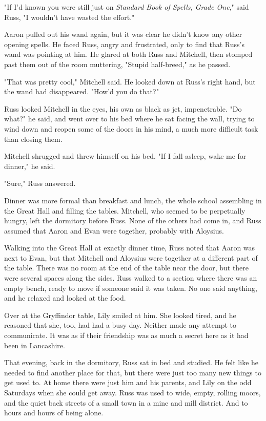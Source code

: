 \documentclass[a4paper,11pt]{article}
\begin{document}
"If I'd known you were still just on \emph{Standard Book of Spells, Grade One}," said Russ, "I wouldn't have wasted the effort."

Aaron pulled out his wand again, but it was clear he didn't know any other opening spells. He faced Russ, angry and frustrated, only to find that Russ's wand was pointing at him. He glared at both Russ and Mitchell, then stomped past them out of the room muttering, "Stupid half-breed," as he passed.

"That was pretty cool," Mitchell said. He looked down at Russ's right hand, but the wand had disappeared. "How'd you do that?"

Russ looked Mitchell in the eyes, his own as black as jet, impenetrable. "Do what?" he said, and went over to his bed where he sat facing the wall, trying to wind down and reopen some of the doors in his mind, a much more difficult task than closing them.

Mitchell shrugged and threw himself on his bed. "If I fall asleep, wake me for dinner," he said.

"Sure," Russ answered.

Dinner was more formal than breakfast and lunch, the whole school assembling in the Great Hall and filling the tables. Mitchell, who seemed to be perpetually hungry, left the dormitory before Russ. None of the others had come in, and Russ assumed that Aaron and Evan were together, probably with Aloysius.

Walking into the Great Hall at exactly dinner time, Russ noted that Aaron was next to Evan, but that Mitchell and Aloysius were together at a different part of the table. There was no room at the end of the table near the door, but there were several spaces along the sides. Russ walked to a section where there was an empty bench, ready to move if someone said it was taken. No one said anything, and he relaxed and looked at the food.

Over at the Gryffindor table, Lily smiled at him. She looked tired, and he reasoned that she, too, had had a busy day. Neither made any attempt to communicate. It was as if their friendship was as much a secret here as it had been in Lancashire.

That evening, back in the dormitory, Russ sat in bed and studied. He felt like he needed to find another place for that, but there were just too many new things to get used to. At home there were just him and his parents, and Lily on the odd Saturdays when she could get away. Russ was used to wide, empty, rolling moors, and the quiet back streets of a small town in a mine and mill district. And to hours and hours of being alone.
\end{document}
